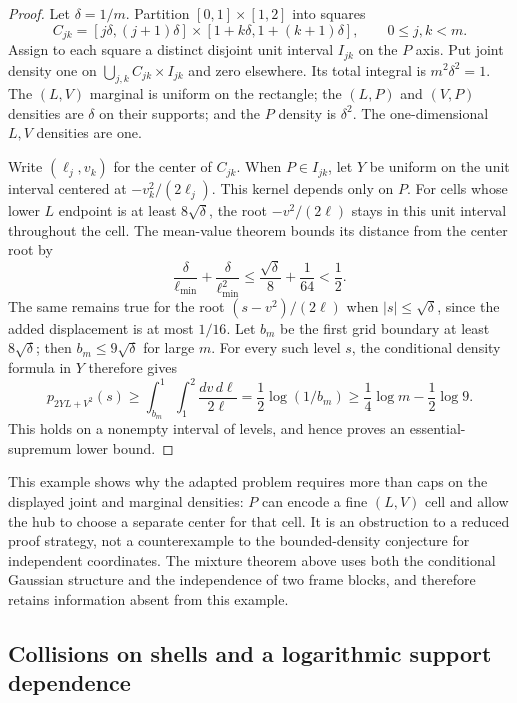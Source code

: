 \begin{proof}
Let $\delta=1/m$.  Partition $[0,1]\times[1,2]$ into squares
\[
 C_{jk}=[j\delta,(j+1)\delta]\times
                    [1+k\delta,1+(k+1)\delta],\qquad0\le j,k<m.
\]
Assign to each square a distinct disjoint unit interval $I_{jk}$
on the $P$ axis.  Put joint density one on
$\bigcup_{j,k}C_{jk}\times I_{jk}$ and zero elsewhere.
Its total integral is $m^2\delta^2=1$.
The $(L,V)$ marginal is uniform on the rectangle; the $(L,P)$ and
$(V,P)$ densities are $\delta$ on their supports; and the $P$ density
is $\delta^2$.  The one-dimensional $L,V$ densities are one.

Write $(\ell_j,v_k)$ for the center of $C_{jk}$.
When $P\in I_{jk}$, let $Y$ be uniform on the unit interval centered
at $-v_k^2/(2\ell_j)$.  This kernel depends only on $P$.
For cells whose lower $L$ endpoint is at least $8\sqrt\delta$,
the root $-v^2/(2\ell)$ stays in this unit interval throughout the
cell.  The mean-value theorem bounds its distance from the center
root by
\[
 \frac\delta{\ell_{\min}}+
             \frac\delta{\ell_{\min}^2}
 \le\frac{\sqrt\delta}{8}+\frac1{64}<\frac12.
\]
The same remains true for the root $(s-v^2)/(2\ell)$ when
$|s|\le\sqrt\delta$, since the added displacement is at most
$1/16$.
Let $b_m$ be the first grid boundary at least $8\sqrt\delta$;
then $b_m\le9\sqrt\delta$ for large $m$.
For every such level $s$, the conditional density formula in $Y$
therefore gives
\[
 p_{2YL+V^2}(s)\ge
 \int_{b_m}^1\int_1^2\frac{dv\,d\ell}{2\ell}
 =\frac12\log(1/b_m)
 \ge\frac14\log m-\frac12\log9.
\]
This holds on a nonempty interval of levels, and hence proves an
essential-supremum lower bound.
\end{proof}

This example shows why the adapted problem requires more than caps
on the displayed joint and marginal densities: $P$ can encode a fine
$(L,V)$ cell and allow the hub to choose a separate center for that
cell.  It is an obstruction to a reduced proof strategy, not a
counterexample to the bounded-density conjecture for independent
coordinates.  The mixture theorem above uses both the conditional
Gaussian structure and the independence of two frame blocks, and
therefore retains information absent from this example.

\subsection{Collisions on shells and a logarithmic support dependence}


